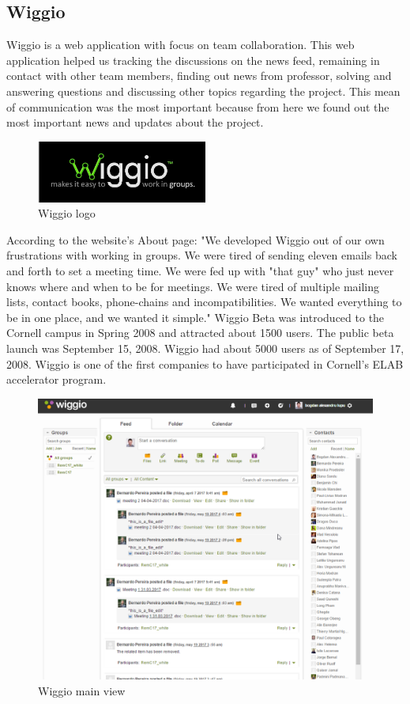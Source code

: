 \subsection{Wiggio}
Wiggio is a web application with focus on team collaboration. This web application helped us tracking the discussions on the news feed, remaining in contact with other team members, finding out news from professor, solving and answering questions and discussing other topics regarding the project. This mean of communication was the most important because from here we found out the most important news and updates about the project.
\begin{figure}[h]
\centering
\caption{Wiggio logo}
\includegraphics[width=0.5\textwidth]{images/wiggio_logo_by_ibleedecw.jpg}
\end{figure}
According to the website's About page: "We developed Wiggio out of our own frustrations with working in groups. We were tired of sending eleven emails back and forth to set a meeting time. We were fed up with "that guy" who just never knows where and when to be for meetings. We were tired of multiple mailing lists, contact books, phone-chains and incompatibilities. We wanted everything to be in one place, and we wanted it simple."
Wiggio Beta was introduced to the Cornell campus in Spring 2008 and attracted about 1500 users. The public beta launch was September 15, 2008. Wiggio had about 5000 users as of September 17, 2008. Wiggio is one of the first companies to have participated in Cornell's ELAB accelerator program.
\begin{figure}[h]
\centering
\caption{Wiggio main view}
\includegraphics[width=\textwidth]{images/wiggio.png}
\end{figure}

